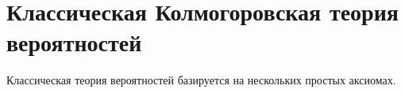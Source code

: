 \section{Классическая Колмогоровская теория вероятностей}

Классическая теория вероятностей базируется на нескольких простых
аксиомах. 

